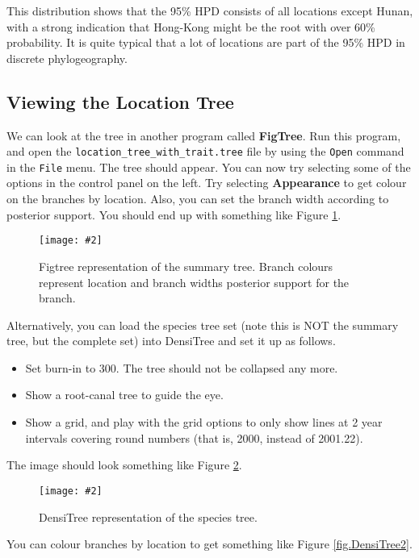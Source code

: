 \documentclass{article}
\newcommand{\includeimage}[2][]{%
\texttt{[image: \#2]}
}
\newcommand{\LocationTree}{{\texttt{location\_tree\_with\_trait.tree}}}
\begin{document}
This distribution shows that the 95\% HPD consists of all locations except Hunan, with a 
strong indication that Hong-Kong might be the root with over 60\% probability. It is quite
typical that a lot of locations are part of the 95\% HPD in discrete phylogeography.

\subsection*{Viewing the Location Tree}

We can look at the tree in another program called {\bf FigTree}. Run this program, and open
the \LocationTree{} file by using the \texttt{Open} command in the \texttt{File} menu. The tree should appear.
You can now try selecting some of the options in the control panel on the left. Try selecting
{\bf Appearance} to get colour on the branches by location. Also, you can set the branch width
according to posterior support. You should end up with something like Figure \ref{fig.figtree}.

\begin{figure}
\centering
\includeimage[scale=0.4]{figures/figtree.pdf}
\caption{Figtree representation of the summary tree. Branch colours represent location
and branch widths posterior support for the branch.}
\label{fig.figtree} 
\end{figure}


Alternatively, you can load the species tree set (note this is NOT the summary tree, but the complete set) into DensiTree and set it up as follows.

\begin{itemize}
\item Set burn-in to 300. The tree should not be collapsed any more.
\item Show a root-canal tree to guide the eye. 
\item Show a grid, and play with the grid options to only show lines at 2 year intervals covering round numbers (that is, 2000, instead of 2001.22).
\end{itemize}

The image should look something like Figure \ref{fig.DensiTree}.

\begin{figure}
\centering
\includeimage[scale=0.4]{figures/DensiTree.pdf}
\caption{DensiTree representation of the species tree.}
\label{fig.DensiTree} 
\end{figure}

You can colour branches by location to get something like Figure \ref{fig.DensiTree2}.
\end{document}
